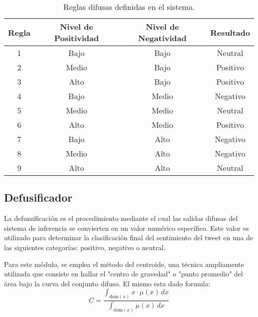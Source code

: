\documentclass[sigconf, review=false, nonacm]{acmart}
\begin{document}
\begin{table}[h!]
	\centering
	\begin{tabular}{|c|c|c|c|}
		\hline
		\textbf{Regla} & \textbf{Nivel de Positividad} & \textbf{Nivel de Negatividad} & \textbf{Resultado} \\ \hline
		1              & Bajo                          & Bajo                          & Neutral            \\ \hline
		2              & Medio                         & Bajo                          & Positivo           \\ \hline
		3              & Alto                          & Bajo                          & Positivo           \\ \hline
		4              & Bajo                          & Medio                         & Negativo           \\ \hline
		5              & Medio                         & Medio                         & Neutral            \\ \hline
		6              & Alto                          & Medio                         & Positivo           \\ \hline
		7              & Bajo                          & Alto                          & Negativo           \\ \hline
		8              & Medio                         & Alto                          & Negativo           \\ \hline
		9              & Alto                          & Alto                          & Neutral            \\ \hline
	\end{tabular}
	\caption{Reglas difusas definidas en el sistema.}
	\label{table:reglas_difusas}
\end{table}

\subsection{Defusificador}
La defuzzificación es el procedimiento mediante el cual las salidas difusas del sistema de inferencia se
convierten en un valor numérico específico. Este valor es utilizado para determinar la clasificación final del
sentimiento del tweet en una de las siguientes categorías: positivo, negativo o neutral.

Para este módulo, se emplea el método del centroide, una técnica ampliamente utilizada que consiste en hallar
el "centro de gravedad" o "punto promedio" del área bajo la curva del conjunto difuso. El mismo esta dado
formula:
$$
	C = \frac{\int_{\text{dom}(x)} x \cdot \mu(x) \, dx}{\int_{\text{dom}(x)} \mu(x) \, dx}
$$
\end{document}
